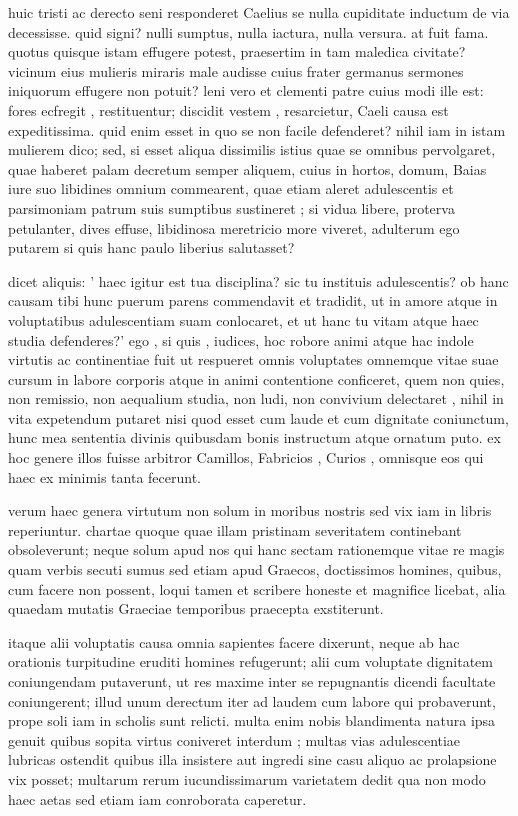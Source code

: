  huic tristi ac derecto seni responderet Caelius se nulla cupiditate inductum de via decessisse. quid signi? nulli sumptus, nulla iactura, nulla versura. at fuit fama. quotus quisque istam effugere potest, praesertim in tam maledica civitate? vicinum eius mulieris miraris male audisse cuius frater germanus sermones iniquorum effugere non potuit? leni vero et clementi patre cuius modi ille est: fores ecfregit , restituentur; discidit vestem , resarcietur, Caeli causa est expeditissima. quid enim esset in quo se non facile defenderet? nihil iam in istam mulierem dico; sed, si esset aliqua dissimilis istius quae se omnibus pervolgaret, quae haberet palam decretum semper aliquem, cuius in hortos, domum, Baias iure suo libidines omnium commearent, quae etiam aleret adulescentis et parsimoniam patrum suis sumptibus sustineret ; si vidua libere, proterva petulanter, dives effuse, libidinosa meretricio more viveret, adulterum ego putarem si quis hanc paulo liberius salutasset?

 dicet aliquis: ' haec igitur est tua disciplina? sic tu instituis adulescentis? ob hanc causam tibi hunc puerum parens commendavit et tradidit, ut in amore atque in voluptatibus adulescentiam suam conlocaret, et ut hanc tu vitam atque haec studia defenderes?' ego , si quis , iudices, hoc robore animi atque hac indole virtutis ac continentiae fuit ut respueret omnis voluptates omnemque vitae suae cursum in labore corporis atque in animi contentione conficeret, quem non quies, non remissio, non aequalium studia, non ludi, non convivium delectaret , nihil in vita expetendum putaret nisi quod esset cum laude et cum dignitate coniunctum, hunc mea sententia divinis quibusdam bonis instructum atque ornatum puto. ex hoc genere illos fuisse arbitror Camillos, Fabricios , Curios , omnisque eos qui haec ex minimis tanta fecerunt.

 verum haec genera virtutum non solum in moribus nostris sed vix iam in libris reperiuntur. chartae quoque quae illam pristinam severitatem continebant obsoleverunt; neque solum apud nos qui hanc sectam rationemque vitae re magis quam verbis secuti sumus sed etiam apud Graecos, doctissimos homines, quibus, cum facere non possent, loqui tamen et scribere honeste et magnifice licebat, alia quaedam mutatis Graeciae temporibus praecepta exstiterunt.

 itaque alii voluptatis causa omnia sapientes facere dixerunt, neque ab hac orationis turpitudine eruditi homines refugerunt; alii cum voluptate dignitatem coniungendam putaverunt, ut res maxime inter se repugnantis dicendi facultate coniungerent; illud unum derectum iter ad laudem cum labore qui probaverunt, prope soli iam in scholis sunt relicti. multa enim nobis blandimenta natura ipsa genuit quibus sopita virtus coniveret interdum ; multas vias adulescentiae lubricas ostendit quibus illa insistere aut ingredi sine casu aliquo ac prolapsione vix posset; multarum rerum iucundissimarum varietatem dedit qua non modo haec aetas sed etiam iam conroborata caperetur.

